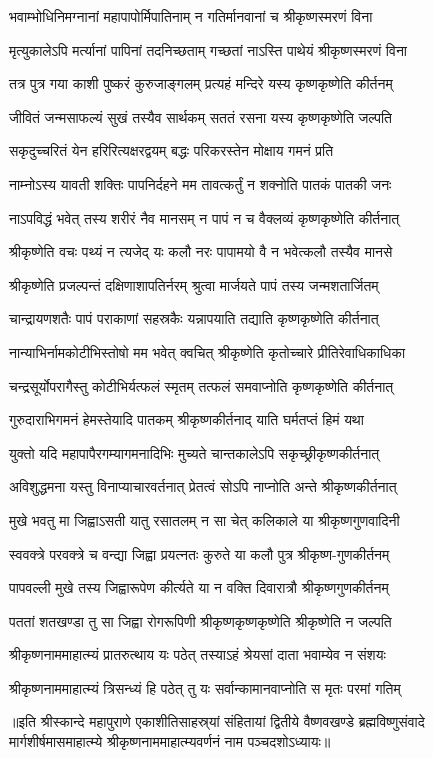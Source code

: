 \twolineshloka
{भवाम्भोधिनिमग्नानां महापापोर्मिपातिनाम्}
{न गतिर्मानवानां च श्रीकृष्णस्मरणं विना} %

\twolineshloka
{मृत्युकालेऽपि मर्त्यानां पापिनां तदनिच्छताम्}
{गच्छतां नाऽस्ति पाथेयं श्रीकृष्णस्मरणं विना} %

\twolineshloka
{तत्र पुत्र गया काशी पुष्करं कुरुजाङ्गलम्}
{प्रत्यहं मन्दिरे यस्य कृष्णकृष्णेति कीर्तनम्} %

\twolineshloka
{जीवितं जन्मसाफल्यं सुखं तस्यैव सार्थकम्}
{सततं रसना यस्य कृष्णकृष्णेति जल्पति} %

\twolineshloka
{सकृदुच्चरितं येन हरिरित्यक्षरद्वयम्}
{बद्धः परिकरस्तेन मोक्षाय गमनं प्रति} %

\twolineshloka
{नाम्नोऽस्य यावती शक्तिः पापनिर्दहने मम}
{तावत्कर्तुं न शक्नोति पातकं पातकी जनः} %

\twolineshloka
{नाऽपविद्धं भवेत् तस्य शरीरं नैव मानसम्}
{न पापं न च वैक्लव्यं कृष्णकृष्णेति कीर्तनात्} %

\twolineshloka
{श्रीकृष्णेति वचः पथ्यं न त्यजेद् यः कलौ नरः}
{पापामयो वै न भवेत्कलौ तस्यैव मानसे} %

\twolineshloka
{श्रीकृष्णेति प्रजल्पन्तं दक्षिणाशापतिर्नरम्}
{श्रुत्वा मार्जयते पापं तस्य जन्मशतार्जितम्} %

\twolineshloka
{चान्द्रायणशतैः पापं पराकाणां सहस्रकैः}
{यन्नापयाति तद्याति कृष्णकृष्णेति कीर्तनात्} %

\twolineshloka
{नान्याभिर्नामकोटीभिस्तोषो मम भवेत् क्वचित्}
{श्रीकृष्णेति कृतोच्चारे प्रीतिरेवाधिकाधिका} %

\twolineshloka
{चन्द्रसूर्योपरागैस्तु कोटीभिर्यत्फलं स्मृतम्}
{तत्फलं समवाप्नोति कृष्णकृष्णेति कीर्तनात्} %

\twolineshloka
{गुरुदाराभिगमनं हेमस्तेयादि पातकम्}
{श्रीकृष्णकीर्तनाद् याति घर्मतप्तं हिमं यथा} %

\twolineshloka
{युक्तो यदि महापापैरगम्यागमनादिभिः}
{मुच्यते चान्तकालेऽपि सकृच्छ्रीकृष्णकीर्तनात्} %

\twolineshloka
{अविशुद्धमना यस्तु विनाप्याचारवर्तनात्}
{प्रेतत्वं सोऽपि नाप्नोति अन्ते श्रीकृष्णकीर्तनात्} %

\twolineshloka
{मुखे भवतु मा जिह्वाऽसती यातु रसातलम्}
{न सा चेत् कलिकाले या श्रीकृष्णगुणवादिनी} %

\twolineshloka
{स्ववक्त्रे परवक्त्रे च वन्द्या जिह्वा प्रयत्नतः}
{कुरुते या कलौ पुत्र श्रीकृष्ण-गुणकीर्तनम्} %

\twolineshloka
{पापवल्ली मुखे तस्य जिह्वारूपेण कीर्त्यते}
{या न वक्ति दिवारात्रौ श्रीकृष्णगुणकीर्तनम्} %

\twolineshloka
{पततां शतखण्डा तु सा जिह्वा रोगरूपिणी}
{श्रीकृष्णकृष्णकृष्णेति श्रीकृष्णेति न जल्पति} %

\twolineshloka
{श्रीकृष्णनाममाहात्म्यं प्रातरुत्थाय यः पठेत्}
{तस्याऽहं श्रेयसां दाता भवाम्येव न संशयः} %

\twolineshloka
{श्रीकृष्णनाममाहात्म्यं त्रिसन्ध्यं हि पठेत् तु यः}
{सर्वान्कामानवाप्नोति स मृतः परमां गतिम्} %


॥इति श्रीस्कान्दे महापुराणे एकाशीतिसाहस्र्यां संहितायां द्वितीये वैष्णवखण्डे ब्रह्मविष्णुसंवादे मार्गशीर्षमासमाहात्म्ये श्रीकृष्णनाममाहात्म्यवर्णनं नाम पञ्चदशोऽध्यायः॥
